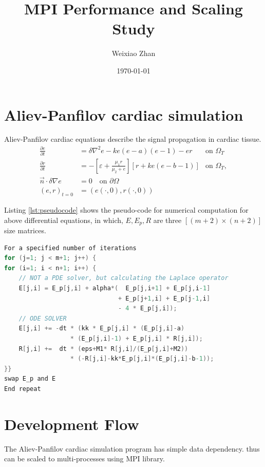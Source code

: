 \documentclass[12pt]{article}
\title{MPI Performance and Scaling Study}
\author{Weixiao Zhan}
\date{\today}
\begin{document}
\maketitle
\section*{Aliev-Panfilov cardiac simulation}
Aliev-Panfilov cardiac equations describe the signal propagation in cardiac tissue.
$$
\begin{aligned}
    \frac{\partial e}{\partial t} 
        &= \delta \nabla^2 e - ke(e - a)(e - 1) - er 
        & \text{on } \Omega_T \\
    \frac{\partial r}{\partial t} 
        &= -\left[\varepsilon + \frac{\mu_1 r}{\mu_2 + e}\right] \left[r + ke(e - b - 1)\right]
        & \text{on } \Omega_T, \\
    \vec{n} \cdot \delta \nabla e 
        &= 0 \quad \text{on } \partial \Omega \\
    (e, r)_{t=0} 
        &= (e(\cdot, 0), r(\cdot, 0))
\end{aligned}
$$

Listing \ref{lst:pseudocode} shows the pseudo-code for numerical computation  
for above differential equations,
in which, $E, E_p, R$ are three $[(m+2) \times (n+2)]$ size matrices.

\begin{minipage}{\textwidth}
\centering
\begin{lstlisting}[language=C]
For a specified number of iterations
for (j=1; j < m+1; j++) {
for (i=1; i < n+1; i++) {
    // NOT a PDE solver, but calculating the Laplace operator
    E[j,i] = E_p[j,i] + alpha*(  E_p[j,i+1] + E_p[j,i-1] 
                               + E_p[j+1,i] + E_p[j-1,i] 
                               - 4 * E_p[j,i]); 
    // ODE SOLVER
    E[j,i] += -dt * (kk * E_p[j,i] * (E_p[j,i]-a) 
                  * (E_p[j,i]-1) + E_p[j,i] * R[j,i]);
    R[j,i] +=  dt * (eps+M1* R[j,i]/(E_p[j,i]+M2))
                  * (-R[j,i]-kk*E_p[j,i]*(E_p[j,i]-b-1));
}}
swap E_p and E
End repeat
\end{lstlisting}
\label{lst:pseudocode}
\end{minipage}

\section{Development Flow}
The Aliev-Panfilov cardiac simulation program has simple data dependency.
thus can be scaled to multi-processes using MPI library.
\end{document}
